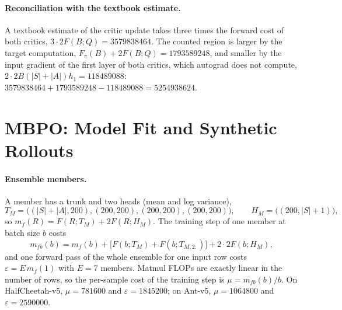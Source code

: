 \paragraph{Reconciliation with the textbook estimate.} A textbook estimate of the critic update takes three times the forward cost of both critics, $3\cdot2F(B;Q)=\num{3579838464}$.
The counted region is larger by the target computation, $F_\pi(B)+2F(B;Q)=\num{1793589248}$, and smaller by the input gradient of the first layer of both critics, which autograd does not compute, $2\cdot2B(|S|+|A|)h_1=\num{118489088}$: $\num{3579838464}+\num{1793589248}-\num{118489088}=\num{5254938624}$.

\section{MBPO: Model Fit and Synthetic Rollouts}\label{sec:app-flop-mbpo}

\paragraph{Ensemble members.} A member has a trunk and two heads (mean and log variance),
\begin{equation*}
  T_M=\bigl((|S|+|A|,200),(200,200),(200,200),(200,200)\bigr),\qquad H_M=\bigl((200,|S|+1)\bigr),
\end{equation*}
so $m_f(R)=F(R;T_M)+2F(R;H_M)$.
The training step of one member at batch size $b$ costs
\begin{equation}
  m_{fb}(b) = m_f(b) + \bigl[F(b;T_M)+F(b;T_{M,2:})\bigr] + 2\cdot2F(b;H_M) ,
  \label{eq:app-member}
\end{equation}
and one forward pass of the whole ensemble for one input row costs $\varepsilon=E\,m_f(1)$ with $E=7$ members.
Matmul FLOPs are exactly linear in the number of rows, so the per-sample cost of the training step is $\mu=m_{fb}(b)/b$.
On HalfCheetah-v5, $\mu=\num{781600}$ and $\varepsilon=\num{1845200}$; on Ant-v5, $\mu=\num{1064800}$ and $\varepsilon=\num{2590000}$.


